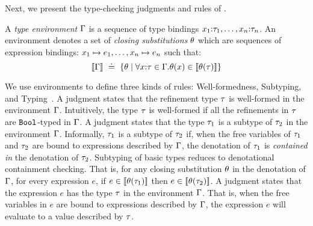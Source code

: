 

Next, we present the type-checking judgments and rules of \undeclang. 

A \emph{type environment} $\Gamma$ is a sequence of type bindings 
$\tbind{x_1}{\typ_1},\ldots,\tbind{x_n}{\typ_n}$. An environment
denotes a set of \emph{closing substitutions} $\theta$ which are 
sequences of expression bindings: 
${x_1} \mapsto {e_1}, \ldots, {x_n} \mapsto {e_n}$ such that:
$$
[\![\Gamma]\!] \ \doteq\   \{\theta \mid \forall {x} \text{:} {\ensuremath{\mathit{\tau}}} \in \Gamma. 
                                    \theta(x) \in [\![\theta(\mathit{\tau})]\!] \}
$$

We use environments to define three kinds of
rules: Well-formedness, Subtyping, 
and Typing~\cite{Knowles10,GordonTOPLAS2011}.
%
A judgment \undeciswellformed{\Env}{\typ} states that 
the refinement type $\mathit{\tau}$ is well-formed in 
the environment $\Gamma$.
%
Intuitively, the type $\mathit{\tau}$ is well-formed if all
the refinements in $\mathit{\tau}$ are $\mathtt{Bool}$-typed in $\Gamma$.
%
A judgment  states 
that the type $\mathit{\tau}_1$ is a subtype of %
$\mathit{\tau}_2$ in the environment $\Gamma$.
%
Informally, $\mathit{\tau}_1$ is a subtype of $\mathit{\tau}_2$ if, when 
the free variables of $\mathit{\tau}_1$ and $\mathit{\tau}_2$ 
are bound to expressions described by $\Gamma$,
the denotation of $\mathit{\tau}_1$ 
is \emph{contained in} the denotation of $\mathit{\tau}_2$. 
%
Subtyping of basic types reduces to denotational containment checking.
%
%
That is, for any closing substitution $\theta$
in the denotation of $\Gamma$, for every expression $e$, 
if $e \in [\![\theta(\mathit{\tau}_1)]\!]$ then 
$ e \in [\![\theta(\mathit{\tau}_2)]\!]$.
%
A judgment  states that
the expression $e$ has the type $\mathit{\tau}$ in 
the environment $\Gamma$.
That is, when the free variables in $e$ are 
bound to expressions described by $\Gamma$, the 
expression $e$ will evaluate to a value 
described by $\mathit{\tau}$.

